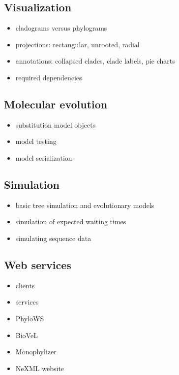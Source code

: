\documentclass{bioinfo}
\begin{document}

\subsection{Visualization}

\begin{itemize}
\item cladograms versus phylograms
\item projections: rectangular, unrooted, radial
\item annotations: collapsed clades, clade labels, pie charts
\item required dependencies
\end{itemize}

\subsection{Molecular evolution}

\begin{itemize}
\item substitution model objects
\item model testing
\item model serialization
\end{itemize}

\subsection{Simulation}

\begin{itemize}
\item basic tree simulation and evolutionary models
\item simulation of expected waiting times
\item simulating sequence data
\end{itemize}

\subsection{Web services}

\begin{itemize}
\item clients
\item services
\item PhyloWS
\item BioVeL
\item Monophylizer
\item NeXML website
\end{itemize}
\end{document}
